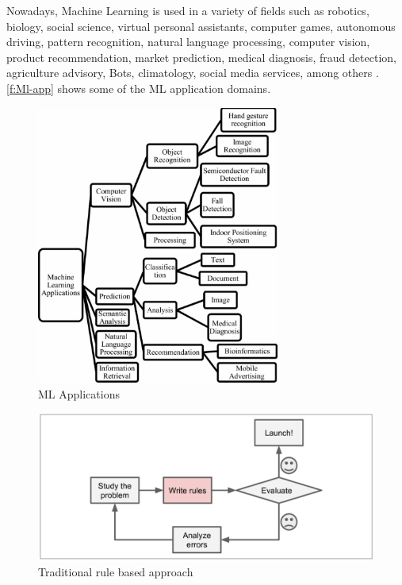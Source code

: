 Nowadays, Machine Learning is used in a variety of fields such as robotics, biology, social science, virtual personal assistants, computer games, autonomous driving, pattern recognition, natural language processing, computer vision, product recommendation, market prediction, medical diagnosis, fraud detection, agriculture advisory, Bots, climatology, social media services, among others \cite{Srivastava_2019, Shinde_2018, Ray2019}. \autoref{f:Ml-app} shows some of the \ac{ML} application domains. 

\begin{figure}[t]
\centering
\includegraphics[width=8cm]{figures/Ch2/ML-Applications.pdf}
\caption{ML Applications \cite{Shinde_2018}}
\label{f:Ml-app}
\end{figure}

\begin{figure}[h]
\centering
\includegraphics[width=14cm]{figures/Ch2/Tradicional-Approach.pdf}
\caption{Traditional rule based approach \cite{geron2017}}
\label{f:Traditional-approach}
\end{figure}

